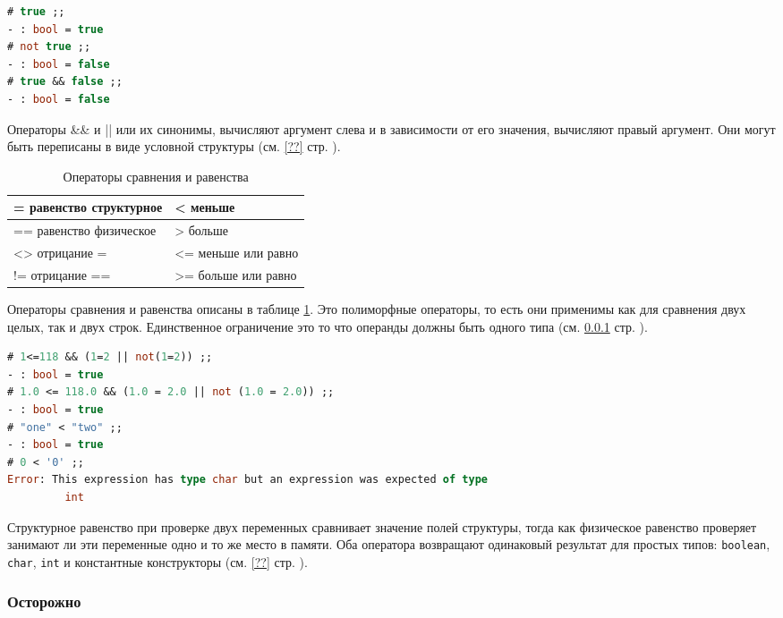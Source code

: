 \begin{lstlisting}[language=OCaml]
# true ;;
- : bool = true
# not true ;;
- : bool = false
# true && false ;;
- : bool = false
\end{lstlisting}

Операторы \&\& и || или их синонимы, вычисляют аргумент слева и в зависимости от
его значения, вычисляют правый аргумент. Они могут быть переписаны в виде
условной структуры (см. \ref{??} стр. \pageref{??}).

\begin{table}[hl]
	\label{tbl:comparison_operations}
\begin{center}
	\caption{Операторы сравнения и равенства}
	\begin{tabular}{|p{5cm}|p{5cm}|}
	\hline
	= равенство структурное & < меньше \\
	\hline
	== равенство физическое & > больше \\
	\hline
	<> отрицание = & <= меньше или равно \\
	\hline
	!= отрицание == & >= больше или равно \\
	\hline
	\end{tabular}
\end{center}
\end{table}

Операторы сравнения и равенства описаны в таблице
\ref{tbl:comparison_operations}. Это полиморфные операторы, то есть они
применимы как для сравнения двух целых, так и двух строк. Единственное
ограничение это то что операнды должны быть одного типа (см. \ref{} стр.
\pageref{}).

\begin{lstlisting}[language=OCaml]
# 1<=118 && (1=2 || not(1=2)) ;;
- : bool = true
# 1.0 <= 118.0 && (1.0 = 2.0 || not (1.0 = 2.0)) ;;
- : bool = true
# "one" < "two" ;;
- : bool = true
# 0 < '0' ;;
Error: This expression has type char but an expression was expected of type
         int
\end{lstlisting}

Структурное равенство при проверке двух переменных сравнивает значение полей
структуры, тогда как физическое равенство проверяет занимают ли эти переменные
одно и то же место в памяти. Оба оператора возвращают одинаковый результат для
простых типов: \texttt{boolean}, \texttt{char}, \texttt{int} и константные
конструкторы (см. \ref{??} стр. \pageref{??}).

\subsubsection{Осторожно}

